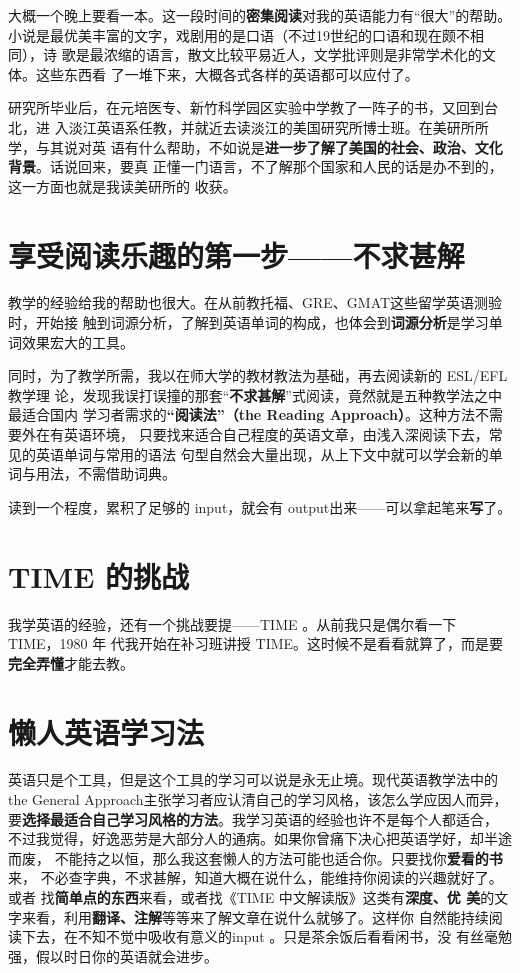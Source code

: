 \documentclass{yufa}
\begin{document}
大概一个晚上要看一本。这一段时间的\textbf{密集阅读}对我的英语能力有“很大”的帮助。
小说是最优美丰富的文字，戏剧用的是口语（不过19世纪的口语和现在颇不相同），诗
歌是最浓缩的语言，散文比较平易近人，文学批评则是非常学术化的文体。这些东西看
了一堆下来，大概各式各样的英语都可以应付了。

研究所毕业后，在元培医专、新竹科学园区实验中学教了一阵子的书，又回到台北，进
入淡江英语系任教，并就近去读淡江的美国研究所博士班。在美研所所学，与其说对英
语有什么帮助，不如说是\textbf{进一步了解了美国的社会、政治、文化背景}。话说回来，要真
正懂一门语言，不了解那个国家和人民的话是办不到的，这一方面也就是我读美研所的
收获。

\section*{享受阅读乐趣的第一步——不求甚解}

教学的经验给我的帮助也很大。在从前教托福、GRE、GMAT这些留学英语测验时，开始接
触到词源分析，了解到英语单词的构成，也体会到\textbf{词源分析}是学习单词效果宏大的工具。

同时，为了教学所需，我以在师大学的教材教法为基础，再去阅读新的 ESL/EFL教学理
论，发现我误打误撞的那套“\textbf{不求甚解}”式阅读，竟然就是五种教学法之中最适合国内
学习者需求的\textbf{“阅读法”（the Reading Approach）}。这种方法不需要外在有英语环境，
只要找来适合自己程度的英语文章，由浅入深阅读下去，常见的英语单词与常用的语法
句型自然会大量出现，从上下文中就可以学会新的单词与用法，不需借助词典。

读到一个程度，累积了足够的 input，就会有 output出来——可以拿起笔来\textbf{写}了。

\section*{TIME 的挑战}

我学英语的经验，还有一个挑战要提——TIME 。从前我只是偶尔看一下 TIME，1980 年
代我开始在补习班讲授 TIME。这时候不是看看就算了，而是要\textbf{完全弄懂}才能去教。

\section*{懒人英语学习法}

英语只是个工具，但是这个工具的学习可以说是永无止境。现代英语教学法中的the
General Approach主张学习者应认清自己的学习风格，该怎么学应因人而异，
要\textbf{选择最适合自己学习风格的方法}。我学习英语的经验也许不是每个人都适合，
不过我觉得，好逸恶劳是大部分人的通病。如果你曾痛下决心把英语学好，却半途而废，
不能持之以恒，那么我这套懒人的方法可能也适合你。只要找你\textbf{爱看的书}来，
不必查字典，不求甚解，知道大概在说什么，能维持你阅读的兴趣就好了。或者
找\textbf{简单点的东西}来看，或者找《TIME 中文解读版》这类有\textbf{深度、优
  美}的文字来看，利用\textbf{翻译、注解}等等来了解文章在说什么就够了。这样你
自然能持续阅读下去，在不知不觉中吸收有意义的input 。只是茶余饭后看看闲书，没
有丝毫勉强，假以时日你的英语就会进步。
\end{document}
